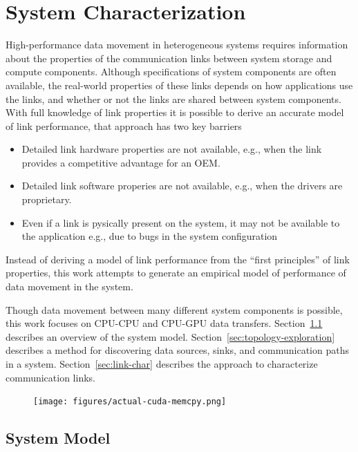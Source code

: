 \chapter{System Characterization}
\label{ch:sys-char}

High-performance data movement in heterogeneous systems requires information about the properties of the communication links between system storage and compute components.
Although specifications of system components are often available, the real-world properties of these links depends on how applications use the links, and whether or not the links are shared between system components.
With full knowledge of link properties it is possible to derive an accurate model of link performance, that approach has two key barriers
\begin{itemize}
    \item Detailed link hardware properties are not available, e.g., when the link provides a competitive advantage for an OEM.
    \item Detailed link software properies are not available, e.g., when the drivers are proprietary.
    \item Even if a link is pysically present on the system, it may not be available to the application {e.g., due to bugs in the system configuration}
\end{itemize}
Instead of deriving a model of link performance from the ``first principles'' of link properties, this work attempts to generate an empirical model of performance of data movement in the system.

Though data movement between many different system components is possible, this work focuses on CPU-CPU and CPU-GPU data transfers.
Section~\ref{sec:system-model} describes an overview of the system model.
Section~\ref{sec:topology-exploration} describes a method for discovering data sources, sinks, and communication paths in a system.
Section~\ref{sec:link-char} describes the approach to characterize communication links.

\begin{figure}[ht]
    \centering
    \texttt{[image: figures/actual-cuda-memcpy.png]}
    \caption[]{}
    \label{fig:actual-cuda-memcpy}
\end{figure}

\section{System Model}
\label{sec:system-model}

